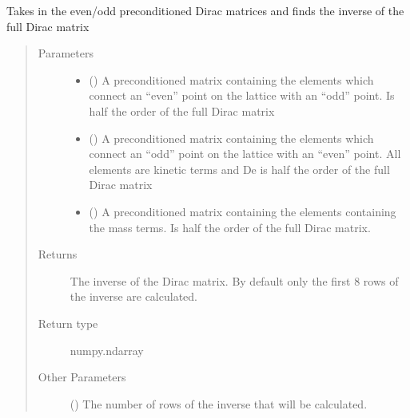 \documentclass[letterpaper,10pt,english]{sphinxmanual}
\begin{document}
\begin{fulllineitems}
\label{\detokenize{index:dirac_generator.invert_dirac}}
Takes in the even/odd preconditioned Dirac matrices and finds
the inverse of the full Dirac matrix
\begin{quote}\begin{description}
\item[{Parameters}] \leavevmode\begin{itemize}
\item {} 
 () \textendash{} A preconditioned matrix containing the elements which connect
an “even” point on the lattice with an “odd” point. Is half the
order of the full Dirac matrix

\item {} 
 () \textendash{} A preconditioned matrix containing the elements which connect
an “odd” point on the lattice with an “even” point. All
elements are kinetic terms and De is half the order of the full
Dirac matrix

\item {} 
 () \textendash{} A preconditioned matrix containing the elements containing the
mass terms. Is half the order of the full Dirac matrix.

\end{itemize}

\item[{Returns}] \leavevmode
The inverse of the Dirac matrix. By default only the first 8
rows of the inverse are calculated.

\item[{Return type}] \leavevmode
numpy.ndarray

\item[{Other Parameters}] \leavevmode
{} () \textendash{} The number of rows of the inverse that will be calculated.

\end{description}\end{quote}

\end{fulllineitems}
\end{document}
